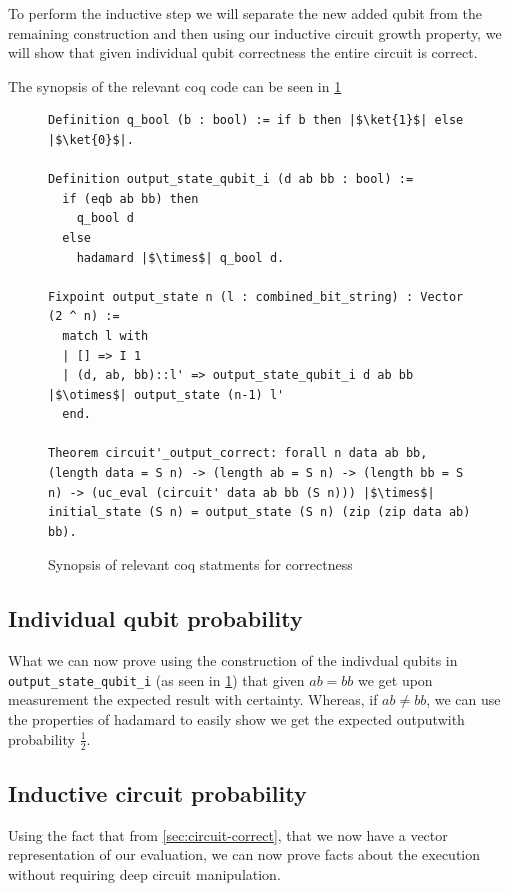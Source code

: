 \documentclass{article}
\begin{document}
To perform the inductive step we will separate the new added qubit from the remaining construction and then using our inductive circuit growth property, we will show that given individual qubit correctness the entire circuit is correct.

The synopsis of the relevant coq code can be seen in \cref{fig:correct-main-circuit}
\begin{figure}[h]
    \centering
\begin{verbatim}
Definition q_bool (b : bool) := if b then |$\ket{1}$| else |$\ket{0}$|.

Definition output_state_qubit_i (d ab bb : bool) :=
  if (eqb ab bb) then
    q_bool d
  else
    hadamard |$\times$| q_bool d.

Fixpoint output_state n (l : combined_bit_string) : Vector (2 ^ n) :=
  match l with
  | [] => I 1
  | (d, ab, bb)::l' => output_state_qubit_i d ab bb |$\otimes$| output_state (n-1) l'
  end.
  
Theorem circuit'_output_correct: forall n data ab bb, (length data = S n) -> (length ab = S n) -> (length bb = S n) -> (uc_eval (circuit' data ab bb (S n))) |$\times$| initial_state (S n) = output_state (S n) (zip (zip data ab) bb).
\end{verbatim}
    \caption{Synopsis of relevant coq statments for correctness}
    \label{fig:correct-main-circuit}
\end{figure}

\subsection{Individual qubit probability}\label{sec:qubit-prob}

What we can now prove using the construction of the indivdual qubits in \texttt{output\_state\_qubit\_i} (as seen in \cref{fig:correct-main-circuit}) that given $ab=bb$ we get upon measurement the expected result with certainty.
Whereas, if $ab\neq bb$, we can use the properties of hadamard to easily show we get the expected outputwith probability $\frac{1}{2}$.

\subsection{Inductive circuit probability}\label{circuit-prob}
Using the fact that from \cref{sec:circuit-correct}, that we now have a vector representation of our evaluation, we can now prove facts about the execution without requiring deep circuit manipulation.
\end{document}
